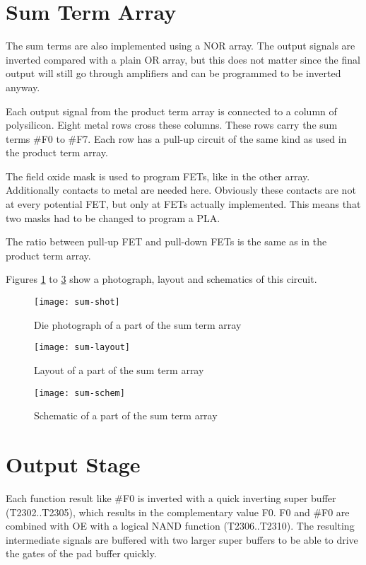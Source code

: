 \clearpage
\section{Sum Term Array}

The sum terms are also implemented using a NOR array. The output signals are
inverted compared with a plain OR array, but this does not matter since the
final output will still go through amplifiers and can be programmed to be
inverted anyway.

Each output signal from the product term array is connected to a column of
polysilicon. Eight metal rows cross these columns. These rows carry the sum
terms \#F0 to \#F7. Each row has a pull-up circuit of the same kind as used in
the product term array.

The field oxide mask is used to program FETs, like in the other array.
Additionally contacts to metal are needed here. Obviously these contacts
are not at every potential FET, but only at FETs actually implemented. This
means that two masks had to be changed to program a PLA.

The ratio between pull-up FET and pull-down FETs is the same as in the
product term array.

Figures \ref{fig:sum-shot} to \ref{fig:sum-schem} show a photograph, layout
and schematics of this circuit.


\begin{figure}
    \centering
    \texttt{[image: sum-shot]}
    \caption{Die photograph of a part of the sum term array}
    \label{fig:sum-shot}
\end{figure}

\begin{figure}
    \centering
    \texttt{[image: sum-layout]}
    \caption{Layout of a part of the sum term array}
    \label{fig:sum-layout}
\end{figure}

\begin{figure}
    \centering
    \texttt{[image: sum-schem]}
    \caption{Schematic of a part of the sum term array}
    \label{fig:sum-schem}
\end{figure}


\clearpage
\section{Output Stage}

Each function result like \#F0 is inverted with a quick inverting super
buffer (T2302..T2305), which results in the complementary value F0. F0 and
\#F0 are combined with OE with a logical NAND function (T2306..T2310). The
resulting intermediate signals are buffered with two larger super buffers to
be able to drive the gates of the pad buffer quickly.

